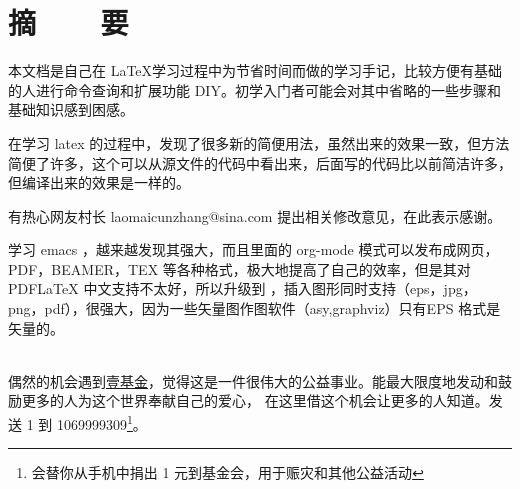 \chapter{摘~~~~要}
 \thispagestyle{fancy} 
本文档是自己在 \LaTeX 学习过程中为节省时间而做的学习手记，比较方便有基础的人进行命令查询和扩展功能 DIY。初学入门者可能会对其中省略的一些步骤和基础知识感到困感。

在学习 latex 的过程中，发现了很多新的简便用法，虽然出来的效果一致，但方法简便了许多，这个可以从源文件的代码中看出来，后面写的代码比以前简洁许多，但编译出来的效果是一样的。

有热心网友村长 laomaicunzhang@sina.com 提出相关修改意见，在此表示感谢。

学习 emacs ，越来越发现其强大，而且里面的 org-mode 模式可以发布成网页，PDF，BEAMER，TEX 等各种格式，极大地提高了自己的效率，但是其对 PDFLaTeX 中文支持不太好，所以升级到 \XeLaTeX ，插入图形同时支持（eps，jpg，png，pdf），很强大，因为一些矢量图作图软件（asy,graphviz）只有EPS 格式是矢量的。

~\\ \color{info} \indent
偶然的机会遇到\href{http://www.onefoundation.cn/}{\textcolor[rgb]{0.00,0.00,1.00}{壹基金}}，觉得这是一件很伟大的公益事业。能最大限度地发动和鼓励更多的人为这个世界奉献自己的爱心，
在这里借这个机会让更多的人知道。发送 1 到 1069999309\footnote{\textcolor[rgb]{1.00,0.50,0.50}{会替你从手机中捐出 1 元到基金会，用于赈灾和其他公益活动}}。\\


  \color{black}

%
